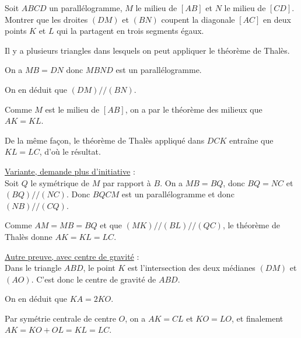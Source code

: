 \begin{exo}
Soit $ABCD$ un parallélogramme, $M$ le milieu de $[AB]$ et $N$ le milieu de $[CD]$. Montrer que les droites $(DM)$ et $(BN)$ coupent la diagonale $[AC]$ en deux points $K$ et $L$ qui la partagent en trois segments égaux.
\begin{center}
\end{center}

\begin{hint}
Il y a plusieurs triangles dans lesquels on peut appliquer le théorème de Thalès.
\end{hint}
\begin{sol}
On a $MB=DN$ donc $MBND$ est un parallélogramme.

On en déduit que $(DM)//(BN)$.

Comme $M$ est le milieu de $[AB]$, on a par le théorème des milieux que $AK=KL$.

De la même façon, le théorème de Thalès appliqué dans $DCK$ entraîne que $KL=LC$, d'où le résultat.

\underline{Variante, demande plus d'initiative} :\\
Soit $Q$ le symétrique de $M$ par rapport à $B$. On a $MB=BQ$, donc $BQ=NC$ et $(BQ)//(NC)$. Donc $BQCM$ est un parallélogramme et donc $(NB)//(CQ)$.

Comme $AM=MB=BQ$ et que $(MK)//(BL)//(QC)$, le théorème de Thalès donne $AK=KL=LC$.

\underline{Autre preuve, avec centre de gravité} :\\
Dans le triangle $ABD$, le point $K$ est l'intersection des deux médianes $(DM)$ et $(AO)$. C'est donc le centre de gravité de $ABD$.

On en déduit que $KA = 2KO$.

Par symétrie centrale de centre $O$, on a $AK=CL$ et $KO=LO$, et finalement $AK = KO+OL = KL = LC$.
\end{sol}
\end{exo}




